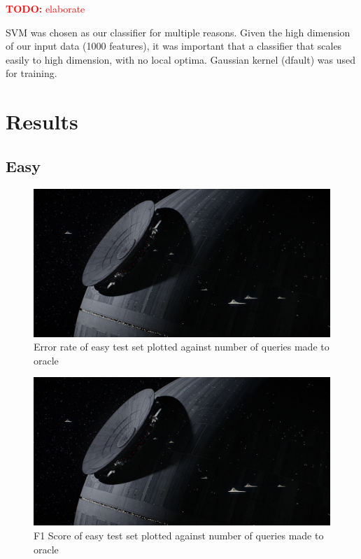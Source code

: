 \documentclass[paper=a4, fontsize=11pt]{scrartcl}
\numberwithin{equation}{section}    %
\numberwithin{figure}{section}      %
\numberwithin{table}{section}       %
\newcommand{\TODO}[1]{\textcolor{red}{\textbf{TODO: } #1}}
\numberwithin{equation}{section}    %
\numberwithin{figure}{section}      %
\numberwithin{table}{section}       %
\begin{document}
\TODO{elaborate}


SVM was chosen as our classifier for multiple reasons. Given the high dimension of our input data (1000 features), it was important that a classifier that scales easily to high dimension, with no local optima. 
Gaussian kernel (dfault) was used for training. 


\section{Results}

\subsection{Easy}


\begin{figure}[!htb]
  \centering
  \includegraphics[scale = 0.35]{figures/fig.jpg}
      \caption{Error rate of easy test set plotted against number of queries made to oracle}
      \label{easyerror}
\end{figure}


\begin{figure}[!htb]
  \centering
  \includegraphics[scale = 0.35]{figures/fig.jpg}
      \caption{F1 Score of easy test set plotted against number of queries made to oracle}
      \label{easyf}
\end{figure}
\end{document}
